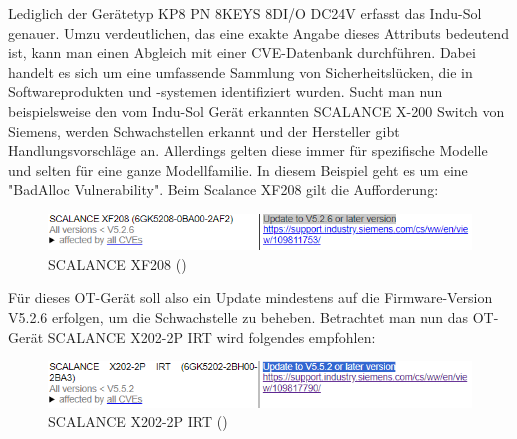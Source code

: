 \bigskip 
\noindent Lediglich der Gerätetyp KP8 PN 8KEYS 8DI/O DC24V erfasst das Indu-Sol genauer. Umzu verdeutlichen, das eine exakte Angabe dieses Attributs bedeutend ist, kann man einen Abgleich mit einer CVE-Datenbank durchführen. Dabei handelt es sich um eine umfassende Sammlung von Sicherheitslücken, die in Softwareprodukten und -systemen identifiziert wurden. Sucht man nun beispielsweise den vom Indu-Sol Gerät erkannten SCALANCE X-200 Switch von Siemens, werden Schwachstellen erkannt und der Hersteller gibt Handlungsvorschläge an. Allerdings gelten diese immer für spezifische Modelle und selten für eine ganze Modellfamilie. In diesem Beispiel geht es um eine "BadAlloc Vulnerability". Beim Scalance XF208 gilt die Aufforderung: 

\clearpage
\begin{figure}[H]
    \centering
    \includegraphics[width=\textwidth]{images/SCALANCEXF208.PNG}
    \caption{SCALANCE XF208 (\cite{SIEMENS1})}
    \label{fig:scalancexf208}
\end{figure}



\noindent Für dieses OT-Gerät soll also ein Update mindestens auf die Firmware-Version V5.2.6 erfolgen, um die Schwachstelle zu beheben. Betrachtet man nun das OT-Gerät SCALANCE X202-2P IRT wird folgendes empfohlen:

\begin{figure}[H]
    \centering
    \includegraphics[width=\textwidth]{images/SCALANCEX202-2PIRT.PNG}
    \caption{SCALANCE X202-2P IRT (\cite{SIEMENS1})}
    \label{fig:scalancex2022pirt}
\end{figure}



